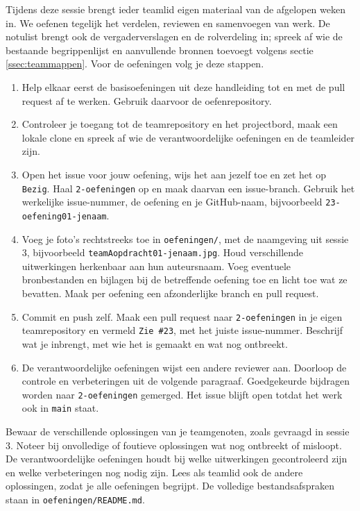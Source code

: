 \documentclass[kulak]{kulakarticle} %
\begin{document}
Tijdens deze sessie brengt ieder teamlid eigen materiaal van de afgelopen
weken in. We oefenen tegelijk het verdelen, reviewen en samenvoegen van werk.
De notulist brengt ook de vergaderverslagen en de rolverdeling in; spreek af
wie de bestaande begrippenlijst en aanvullende bronnen toevoegt volgens
sectie \ref{ssec:teammappen}. Voor de oefeningen volg je deze stappen.
\begin{enumerate}
    \item Help elkaar eerst de basisoefeningen uit deze handleiding tot en
    met de pull request af te werken. Gebruik daarvoor de oefenrepository.
    \item Controleer je toegang tot de teamrepository en het projectbord,
    maak een lokale clone en spreek af wie de verantwoordelijke oefeningen
    en de teamleider zijn.
    \item Open het issue voor jouw oefening, wijs het aan jezelf toe en zet
    het op \texttt{Bezig}. Haal \texttt{2-oefeningen} op en maak daarvan
    een issue-branch. Gebruik het werkelijke issue-nummer, de oefening en
    je GitHub-naam, bijvoorbeeld \texttt{23-oefening01-jenaam}.
    \item Voeg je foto's rechtstreeks toe in \texttt{oefeningen/}, met
    de naamgeving uit sessie 3, bijvoorbeeld
    \texttt{teamAopdracht01-jenaam.jpg}. Houd verschillende uitwerkingen
    herkenbaar aan hun auteursnaam. Voeg eventuele bronbestanden en
    bijlagen bij de betreffende oefening toe en licht toe wat ze bevatten.
    Maak per oefening een afzonderlijke branch en pull request.
    \item Commit en push zelf. Maak een pull request naar
    \texttt{2-oefeningen} in je eigen teamrepository en vermeld
    \texttt{Zie \#23}, met het juiste issue-nummer. Beschrijf wat je
    inbrengt, met wie het is gemaakt en wat nog ontbreekt.
    \item De verantwoordelijke oefeningen wijst een andere reviewer aan.
    Doorloop de controle en verbeteringen uit de volgende paragraaf.
    Goedgekeurde bijdragen worden naar \texttt{2-oefeningen} gemerged.
    Het issue blijft open totdat het werk ook in \texttt{main} staat.
\end{enumerate}

Bewaar de verschillende oplossingen van je teamgenoten, zoals gevraagd
in sessie 3. Noteer bij onvolledige of foutieve oplossingen wat nog
ontbreekt of misloopt. De verantwoordelijke oefeningen houdt bij welke
uitwerkingen gecontroleerd zijn en welke verbeteringen nog nodig zijn.
Lees als teamlid ook de andere oplossingen, zodat je alle oefeningen
begrijpt. De volledige bestandsafspraken staan in
\texttt{oefeningen/README.md}.
\end{document}
